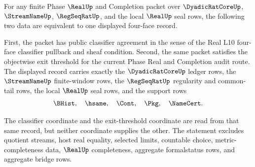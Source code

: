 \begin{theorem}
\label{thm:real-l10-exit-threshold-classifier-coherence}
For any finite Phase $\RealUp$ and Completion packet over $\DyadicRatCoreUp$, $\StreamNameUp$, $\RegSeqRatUp$, and the local $\RealUp$ seal rows, the following two data are equivalent to one displayed four-face record.

First, the packet has public classifier agreement in the sense of the Real L10 four-face classifier pullback and sheaf condition. Second, the same packet satisfies the objectwise exit threshold for the current Phase Real and Completion audit route. The displayed record carries exactly the $\DyadicRatCoreUp$ ledger rows, the $\StreamNameUp$ finite-window rows, the $\RegSeqRatUp$ regularity and common-tail rows, the local $\RealUp$ seal rows, and the support rows
$$
\BHist,\quad \hsame,\quad \Cont,\quad \Pkg,\quad \NameCert.
$$

The classifier coordinate and the exit-threshold coordinate are read from that same record, but neither coordinate supplies the other. The statement excludes quotient streams, host real equality, selected limits, countable choice, metric-completeness data, $\RealUp$ completeness, aggregate formalstatus rows, and aggregate bridge rows.
\end{theorem}
